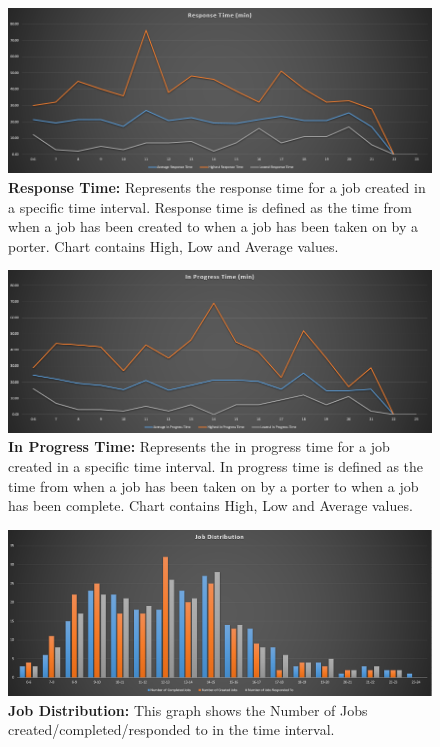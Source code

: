 \documentclass[paper=letter, fontsize=10pt]{scrartcl}
\numberwithin{equation}{section}		%
\numberwithin{figure}{section}			%
\numberwithin{table}{section}				%
\begin{document}
		\begin{figure}[!htbp]		
		\begin{center}
			\includegraphics[width=1\columnwidth, height=0.4\textheight, keepaspectratio]{responseTime.png}
			\caption{\textbf{Response Time:} Represents the response time for a job created in a specific time interval. Response time is defined as the time from when a job has been created to when a job has been taken on by a porter. Chart contains High, Low and Average values.}
		\end{center}
		\end{figure}
		\begin{figure}[!htbp]		
		\begin{center}
			\includegraphics[width=1\columnwidth, height=0.4\textheight, keepaspectratio]{inProgress.png}
			\caption{\textbf{In Progress Time:} Represents the in progress time for a job created in a specific time interval. In progress time is defined as the time from when a job has been taken on by a porter to when a job has been complete. Chart contains High, Low and Average values.}
		\end{center}
		\end{figure}
		\begin{figure}[!htbp]		
		\begin{center}
			\includegraphics[width=1\columnwidth, height=0.4\textheight, keepaspectratio]{numberOfJobs.png}
			\caption{\textbf{Job Distribution:} This graph shows the Number of Jobs created/completed/responded to in the time interval.}
		\end{center}
		\end{figure}
\end{document}
